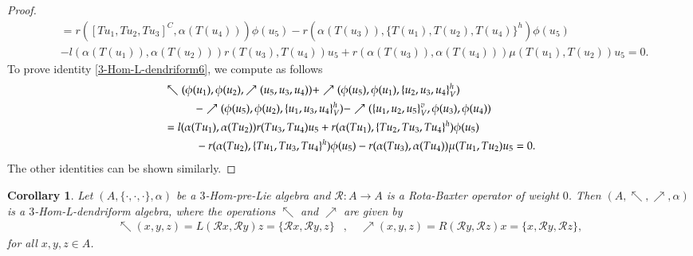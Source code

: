\documentclass[a4paper,11pt]{article}
\def\c{\cdot}
\def\nw{\nwarrow}
\def\ne{\nearrow}
\newtheorem{cor}[thm]{Corollary}
\theoremstyle{definition}
\begin{document}
\begin{proof}
\begin{align*}
&=r([Tu_1,Tu_2,Tu_3]^C,\alpha(T(u_4)))\phi(u_5)-r(\alpha(T(u_3)),\{T(u_1),T(u_2),T(u_4)\}^h)\phi(u_5) \\
&-l(\alpha(T(u_1)),\alpha(T(u_2)))r(T(u_3),T(u_4))u_5 +r(\alpha(T(u_3)),\alpha(T(u_4)))\mu(T(u_1),T(u_2))u_5=0.
\end{align*}
To prove identity \eqref{3-Hom-L-dendriform6}, we compute as follows
\begin{align*}
& \nw(\phi(u_1),\phi(u_2),\ne(u_5,u_3,u_4))+\ne(\phi(u_5),\phi(u_1),\{u_2,u_3,u_4\}^h_V) \\
&\hspace{1 cm} -\ne(\phi(u_5),\phi(u_2),\{u_1,u_3,u_4\}^h_V)-\ne(\{u_1,u_2,u_5\}^v_V,\phi(u_3),\phi(u_4))  \\
    &=l(\alpha(Tu_1),\alpha(Tu_2))r(Tu_3,Tu_4)u_5+r(\alpha(Tu_1),\{Tu_2,Tu_3,Tu_4\}^h)\phi(u_5)  \\
    & \hspace{1 cm} -r(\alpha(Tu_2),\{Tu_1,Tu_3,Tu_4\}^h)\phi(u_5)-r(\alpha(Tu_3),\alpha(Tu_4))\mu(Tu_1,Tu_2)u_5=0.
\end{align*}
The other identities can be shown similarly.
\end{proof}
\begin{cor}\label{3HomLden by invert O-op}
   Let $(A,\{\c,\c,\c\},\alpha)$ be a $3$-Hom-pre-Lie algebra and  $\mathcal R: A \to A$ is a Rota-Baxter operator of weight $0$. Then $(A,\nw,\ne,\alpha)$ is  a $3$-Hom-L-dendriform algebra, where the operations $\nw$ and $\ne$ are  given by
 \begin{align}\label{LDendViaRB}
  \nw(x,y,z)=L(\mathcal Rx,\mathcal Ry)z=\{\mathcal Rx,\mathcal Ry,z\}  &, \quad \ne(x, y,z)= R(\mathcal Ry,\mathcal Rz)x=\{x,\mathcal Ry,\mathcal Rz\},  \end{align}
for all $x,y,z \in A$.

\end{cor}
%
\end{document}
